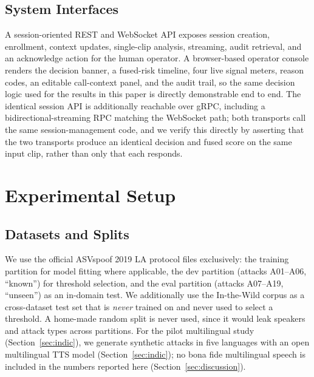 \documentclass[conference]{IEEEtran}
\begin{document}
\subsection{System Interfaces}
A session-oriented REST and WebSocket API exposes session creation,
enrollment, context updates, single-clip analysis, streaming, audit
retrieval, and an acknowledge action for the human operator. A
browser-based operator console renders the decision banner, a fused-risk
timeline, four live signal meters, reason codes, an editable call-context
panel, and the audit trail, so the same decision logic used for the
results in this paper is directly demonstrable end to end. The identical
session API is additionally reachable over gRPC, including a
bidirectional-streaming RPC matching the WebSocket path; both transports
call the same session-management code, and we verify this directly by
asserting that the two transports produce an identical decision and fused
score on the same input clip, rather than only that each responds.

\section{Experimental Setup}
\label{sec:setup}

\subsection{Datasets and Splits}
We use the official ASVspoof 2019 LA protocol files exclusively: the
training partition for model fitting where applicable, the dev
partition (attacks A01--A06, ``known'') for threshold selection, and the
eval partition (attacks A07--A19, ``unseen'') as an in-domain test. We
additionally use the In-the-Wild corpus \cite{mueller2022generalize} as
a cross-dataset test set that is \emph{never} trained on and never used
to select a threshold. A home-made random split is never used, since it
would leak speakers and attack types across partitions. For the pilot
multilingual study (Section~\ref{sec:indic}), we generate synthetic
attacks in five languages with an open multilingual TTS model
\cite{mms} (Section~\ref{sec:indic}); no bona fide multilingual speech
is included in the numbers reported here (Section~\ref{sec:discussion}).
\end{document}
